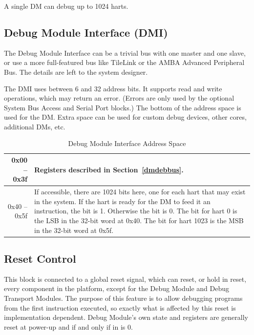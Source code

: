 \documentclass{article}
\begin{document}
A single DM can debug up to 1024 harts.

\subsection{Debug Module Interface (DMI)} \label{dmi}

The Debug Module Interface can be a trivial bus with one master and one slave,
or use a more full-featured bus like TileLink or the AMBA Advanced Peripheral
Bus. The details are left to the system designer.

The DMI uses between 6 and 32 address bits.  It supports read and write
operations, which may return an error. (Errors are only used by the optional
System Bus Access and Serial Port blocks.) The bottom of the address space is
used for the DM. Extra space can be used for custom debug devices, other cores,
additional DMs, etc.

\begin{table}[htp]
    \centering
    \caption{Debug Module Interface Address Space}
    \label{tab:header}
    \begin{tabulary}{\textwidth}{|r|L|}
        \hline
        0x00 -- 0x3f & Registers described in Section~\ref{dmdebbus}. \\
        \hline
        0x40 -- 0x5f & If accessible, there are 1024 bits here, one for each
        hart that may exist in the system. If the hart is ready for the DM to
        feed it an instruction, the bit is 1. Otherwise the bit is 0. The bit
        for hart 0 is the LSB in the 32-bit word at 0x40. The bit for hart 1023
        is the MSB in the 32-bit word at 0x5f. \\
        \hline
    \end{tabulary}
\end{table}

\subsection{Reset Control} \label{reset}

This block is connected to a global reset signal, which can
reset, or hold in reset, every component in the platform,
except for the Debug Module and Debug
Transport Modules. The purpose of this feature is to allow debugging
programs from the first instruction executed, so exactly what is affected
by this reset is implementation dependent. Debug Module's own state and registers are
generally reset at power-up and if and only if
\Fdmactive in \Rdmcontrol is 0.
\end{document}
